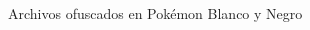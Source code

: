 \begin{frame}[fragile]{Archivos ofuscados en Pokémon Blanco y Negro}
\begin{columns}
\begin{column}{0.25\textwidth}
    \vfill
    \vspace{0.35cm}
\end{column}


\end{columns}
\end{frame}
